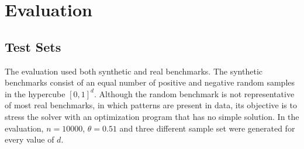 \documentclass[11pt]{article}
\theoremstyle{definition}
\begin{document}
\section{Evaluation}
\label{sec:eval}

\subsection{Test Sets}
The evaluation used both synthetic and real benchmarks.
The synthetic benchmarks consist of 
an equal number of positive and negative random samples 
in the hypercube $[0, 1]^d$.
Although the random benchmark is not representative of 
most real benchmarks, in which patterns are present in data, 
its objective is to stress the solver with an 
optimization program that has no simple solution.
In the evaluation, $n = 10000$, $\theta = 0.51$
and three different sample set
were generated for every value of $d$.
\end{document}
